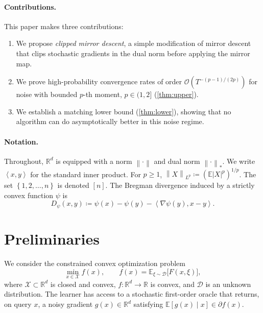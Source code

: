 \documentclass[11pt,a4paper]{article}
\theoremstyle{plain}
\theoremstyle{definition}
\theoremstyle{remark}
\newcommand{\R}{\mathbb{R}}
\newcommand{\E}{\mathbb{E}}
\newcommand{\norm}[1]{\left\lVert#1\right\rVert}
\newcommand{\abs}[1]{\left\lvert#1\right\rvert}
\newcommand{\inner}[2]{\left\langle#1,#2\right\rangle}
\newcommand{\set}[1]{\left\{#1\right\}}
\begin{document}
\paragraph{Contributions.}
This paper makes three contributions:
\begin{enumerate}[label=(\roman*)]
    \item We propose \emph{clipped mirror descent}, a simple modification of
          mirror descent that clips stochastic gradients in the dual norm
          before applying the mirror map.
    \item We prove high-probability convergence rates of order
          $\mathcal{O}(T^{-(p-1)/(2p)})$ for noise with bounded $p$-th moment,
          $p \in (1, 2]$ (\cref{thm:upper}).
    \item We establish a matching lower bound (\cref{thm:lower}), showing that
          no algorithm can do asymptotically better in this noise regime.
\end{enumerate}

\paragraph{Notation.}
Throughout, $\R^d$ is equipped with a norm $\norm{\cdot}$ and dual norm
$\norm{\cdot}_*$. We write $\inner{x}{y}$ for the standard inner product. For
$p \geq 1$, $\norm{X}_{L^p} \coloneqq (\E\abs{X}^p)^{1/p}$. The set
$\set{1, 2, \ldots, n}$ is denoted $[n]$. The Bregman divergence induced by a
strictly convex function $\psi$ is
\begin{equation*}
    D_\psi(x, y) \coloneqq \psi(x) - \psi(y) - \inner{\nabla \psi(y)}{x - y}.
\end{equation*}

\section{Preliminaries}
\label{sec:prelim}

We consider the constrained convex optimization problem
\begin{equation}
\label{eq:problem}
    \min_{x \in \mathcal{X}} f(x), \qquad
    f(x) = \E_{\xi \sim \mathcal{D}}\bigl[ F(x, \xi) \bigr],
\end{equation}
where $\mathcal{X} \subset \R^d$ is closed and convex, $f \colon \R^d \to \R$
is convex, and $\mathcal{D}$ is an unknown distribution. The learner has
access to a stochastic first-order oracle that returns, on query $x$, a noisy
gradient $g(x) \in \R^d$ satisfying $\E[g(x) \mid x] \in \partial f(x)$.
\end{document}
